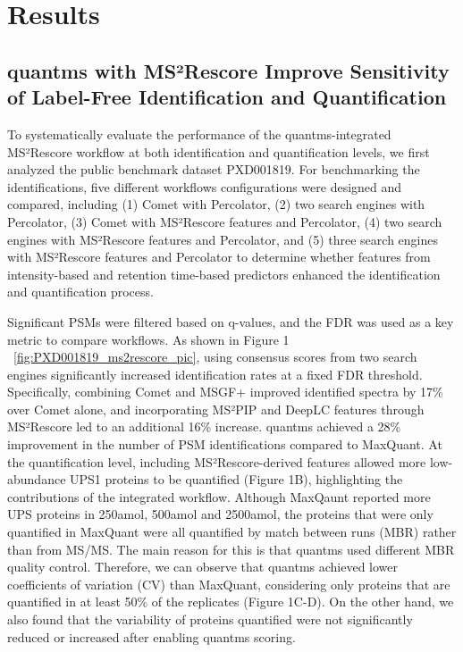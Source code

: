 \documentclass[12pt]{article}
\begin{document}
\section{Results}

\subsection{quantms with MS²Rescore Improve Sensitivity of Label-Free Identification and Quantification}
To systematically evaluate the performance of the quantms-integrated MS²Rescore workflow at both identification and quantification levels, we first analyzed the public benchmark dataset PXD001819. For benchmarking the identifications, five different workflows configurations were designed and compared, including (1) Comet with Percolator, (2) two search engines with Percolator, (3) Comet with MS²Rescore features and Percolator, (4) two search engines with MS²Rescore features and Percolator, and (5) three search engines with MS²Rescore features and Percolator to determine whether features from intensity-based and retention time-based predictors enhanced the identification and quantification process.

Significant PSMs were filtered based on q-values, and the FDR was used as a key metric to compare workflows. As shown in Figure 1 ~\ref{fig:PXD001819_ms2rescore_pic}, using consensus scores from two search engines significantly increased identification rates at a fixed FDR threshold. Specifically, combining Comet and MSGF+ improved identified spectra by 17\% over Comet alone, and incorporating MS²PIP and DeepLC features through MS²Rescore led to an additional 16\% increase. quantms achieved a 28\% improvement in the number of PSM identifications compared to MaxQuant. At the quantification level, including MS²Rescore-derived features allowed more low-abundance UPS1 proteins to be quantified (Figure 1B), highlighting the contributions of the integrated workflow. Although MaxQaunt reported more UPS proteins in 250amol, 500amol and 2500amol, the proteins that were only quantified in MaxQuant were all quantified by match between runs (MBR) rather than from MS/MS. The main reason for this is that quantms used different MBR quality control. Therefore, we can observe that quantms achieved lower coefficients of variation (CV) than MaxQuant, considering only proteins that are quantified in at least 50\% of the replicates (Figure 1C-D). On the other hand, we also found that the variability of proteins quantified were not significantly reduced or increased after enabling quantms  scoring.
\end{document}
